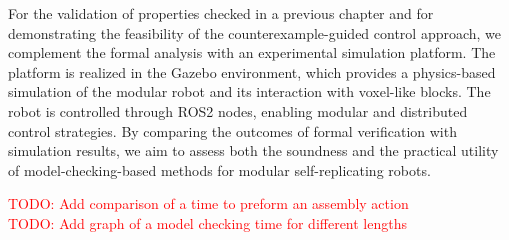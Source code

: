 For the validation of  properties checked in a previous chapter
and for demonstrating the feasibility of 
the counterexample-guided control approach, we complement the formal analysis 
with an experimental simulation platform. The platform is realized in 
the Gazebo environment, which provides a physics-based simulation of 
the modular robot and its interaction with voxel-like blocks. The robot 
is controlled through ROS2 nodes, enabling modular and distributed control 
strategies. By comparing the outcomes of formal verification with simulation 
results, we aim to assess both the soundness and the practical utility of 
model-checking-based methods for modular self-replicating robots.



\textcolor{red}{TODO: Add comparison of a time to preform an assembly action}\\
\textcolor{red}{TODO: Add graph of a model checking time for different lengths}\\

